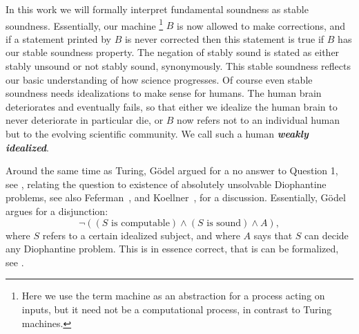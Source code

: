 \documentclass{amsart}  %
\numberwithin{equation}{section}
\theoremstyle{definition}
\theoremstyle{remark}
\begin{document}
{In this work we will formally interpret fundamental soundness as stable soundness. 
Essentially, our machine \footnote {Here we use the term machine as an abstraction for a process acting on inputs, but it need not be a  computational process, in contrast to Turing machines.} $B$ is now allowed to make corrections, and if a statement printed by $B$ is never corrected then this statement is true if $B$ has our stable soundness property. The negation of stably sound is stated as either stably unsound or not stably sound, synonymously. This stable soundness reflects our basic understanding of how science progresses. Of course even stable soundness needs idealizations to make sense for humans. The human brain deteriorates and eventually fails, so that either we idealize the human brain to never deteriorate in particular die, or $B$ now refers not to an individual human but to the evolving scientific community.  We call such a human \textbf{\emph{weakly idealized}}.

Around the same time as Turing, G\"odel argued for a no answer to Question 1, see \cite[310]{citeGodel}, relating the question to existence of absolutely unsolvable Diophantine problems, see also Feferman~\cite{citeFeferman2006-SFEATA}, and Koellner~\cite{citeKoellner2018-KOEOTQ-3}, \cite{citeKoellnerII2018-KOEOTQ-4} for a discussion.  
Essentially, G\"odel argues for a disjunction:
\begin{equation*}
   \neg ((S \text{ is computable}) \land (S \text{ is sound}) \land A),
\end{equation*}
where $S$ refers to a certain idealized subject, and where $A$ says that $S$ can decide any Diophantine problem. This is in essence correct, that is can be formalized, see  \cite{citeKoellnerII2018-KOEOTQ-4}.

}
\end{document}
